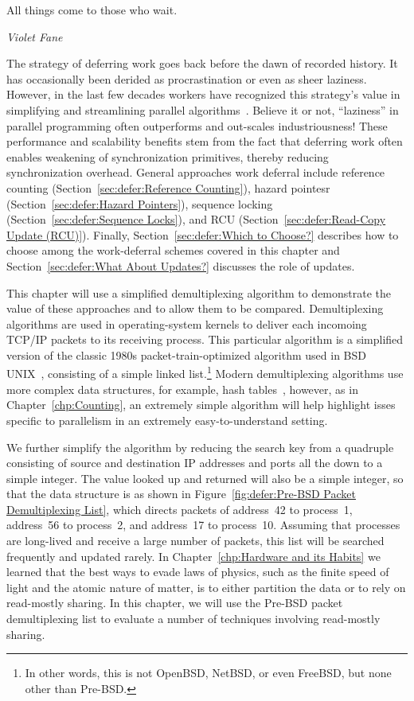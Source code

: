 

\epigraph{All things come to those who wait.}{\emph{Violet Fane}}

The strategy of deferring work goes back before the dawn of recorded
history. It has occasionally been derided as procrastination or
even as sheer laziness.
However, in the last few decades workers have recognized this strategy's value
in simplifying and streamlining parallel algorithms~\cite{Kung80,HMassalinPhD}.
Believe it or not, ``laziness'' in parallel programming often outperforms and
out-scales industriousness!
These performance and scalability benefits stem from the fact that
deferring work often enables weakening of synchronization primitives,
thereby reducing synchronization overhead.
General approaches work deferral include
reference counting (Section~\ref{sec:defer:Reference Counting}),
hazard pointesr (Section~\ref{sec:defer:Hazard Pointers}),
sequence locking (Section~\ref{sec:defer:Sequence Locks}),
and RCU (Section~\ref{sec:defer:Read-Copy Update (RCU)}).
Finally, Section~\ref{sec:defer:Which to Choose?}
describes how to choose among the work-deferral schemes covered in
this chapter and Section~\ref{sec:defer:What About Updates?}
discusses the role of updates.

This chapter will use a simplified demultiplexing algorithm to demonstrate
the value of these approaches and to allow them to be compared.
Demultiplexing algorithms are used in operating-system kernels to
deliver each incomoing TCP/IP packets to its receiving process.
This particular algorithm is a simplified version of the classic 1980s
packet-train-optimized algorithm used in BSD UNIX~\cite{VanJacobson88},
consisting of a simple linked list.\footnote{
	In other words, this is not OpenBSD, NetBSD, or even
	FreeBSD, but none other than Pre-BSD.}
Modern demultiplexing algorithms use more complex data structures,
for example, hash tables~\cite{McKenney92b}, however, as in
Chapter~\ref{chp:Counting}, an extremely simple algorithm will
help highlight isses specific to parallelism in an extremely
easy-to-understand setting.

We further simplify the algorithm by reducing the search key from
a quadruple consisting of source and destination IP addresses and
ports all the down to a simple integer.
The value looked up and returned will also be a simple integer,
so that the data structure is as shown in
Figure~\ref{fig:defer:Pre-BSD Packet Demultiplexing List}, which
directs packets of address~42 to process~1, address~56 to
process~2, and address~17 to process~10.
Assuming that processes are long-lived and receive a large number
of packets, this list will be searched frequently and updated
rarely.
In Chapter~\ref{chp:Hardware and its Habits}
we learned that the best ways to evade laws of physics, such as
the finite speed of light and the atomic nature of matter, is to
either partition the data or to rely on read-mostly sharing.
In this chapter, we will use the Pre-BSD packet demultiplexing
list to evaluate a number of techniques involving read-mostly
sharing.

